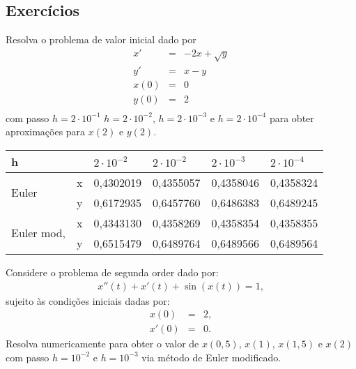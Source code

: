 \subsection*{Exercícios}

\begin{exer}Resolva o problema de valor inicial dado por
\begin{eqnarray}
x'&=& -2x + \sqrt{y}\\
y'&=& x - y\\
x(0)&=&0\\
y(0)&=&2\\
\end{eqnarray}
com passo $h=2\cdot 10^{-1}$ $h=2\cdot 10^{-2}$, $h=2\cdot 10^{-3}$ e $h=2\cdot 10^{-4}$ para obter aproximações para $x(2)$ e $y(2)$.
\end{exer}
\begin{resp}

 \begin{center}
 \begin{tabular}{|l|l|l|l|l|l|}%
\hline
   h                   & &$2\cdot 10^{-2}$&$2\cdot 10^{-2}$&$2\cdot 10^{-3}$&$2\cdot 10^{-4}$\\
   \hline
 \multirow{2}{*}{Euler}&x&0,4302019&0,4355057&0,4358046&0,4358324\\
                       &y& 0,6172935&0,6457760&0,6486383&0,6489245\\
  \hline

 \multirow{2}{*}{Euler mod,}&x&  0,4343130&0,4358269&0,4358354&0,4358355\\
                       &y& 0,6515479&0,6489764&0,6489566&0,6489564 \\

   \hline


 \end{tabular}
\end{center}
\end{resp}

\begin{exer} Considere o problema de segunda order dado por:
\begin{eqnarray}
 x''(t)+x'(t)+\sin(x(t))=1,
\end{eqnarray}
sujeito às condições iniciais dadas por:
\begin{eqnarray}
x(0)&=&2,\\
x'(0)&=&0.
\end{eqnarray}
Resolva numericamente para obter o valor de $x(0,5)$, $x(1)$, $x(1,5)$ e $x(2)$ com passo $h=10^{-2}$ e $h=10^{-3}$ via método de Euler modificado.
\end{exer}

